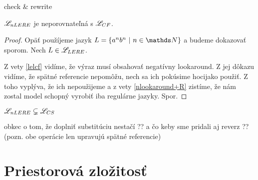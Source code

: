 \TODO check \& rewrite
\begin{veta}
$\mathscr{L}_{nLERE}$ je neporovnateľná s $ \mathscr{L}_{CF}$.
\end{veta}
\begin{proof}
Opäť použíjeme jazyk $L=\lbrace a^nb^n~|~n \in \N \rbrace$ a budeme dokazovať sporom. Nech $L \in \mathscr{L}_{LERE}$.

Z vety \ref{lelcf} vidíme, že výraz musí obsahovať negatívny lookaround. Z jej dôkazu vidíme, že spätné referencie nepomôžu, nech sa ich pokúsime hocijako použiť. Z toho vyplýva, že ich nepoužijeme a z vety \ref{nlookaround+R} zistíme, že nám zostal model schopný vyrobiť iba regulárne jazyky. Spor.
\end{proof}

\begin{dosledok}
$\mathscr{L}_{nLERE} \subsetneq \mathscr{L}_{CS}$
\end{dosledok}

\TODO obkec o tom, že doplniť substitúciu nestačí
\TODO ?? a čo keby sme pridali aj reverz ?? (pozn. obe operácie len upravujú spätné referencie)

\section{Priestorová zložitosť}

